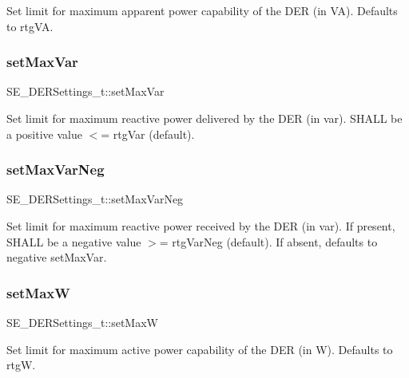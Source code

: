 Set limit for maximum apparent power capability of the D\+ER (in VA). Defaults to rtg\+VA. \mbox{\label{group__DERSettings_ga40736afafc4625a920cd726bb86c889f}} 
\subsubsection{\texorpdfstring{set\+Max\+Var}{setMaxVar}}
{\footnotesize\ttfamily S\+E\+\_\+\+D\+E\+R\+Settings\+\_\+t\+::set\+Max\+Var}

Set limit for maximum reactive power delivered by the D\+ER (in var). S\+H\+A\+LL be a positive value $<$= rtg\+Var (default). \mbox{\label{group__DERSettings_gab5d6fb6cb61c4d10e02d3717c40603a7}} 
\subsubsection{\texorpdfstring{set\+Max\+Var\+Neg}{setMaxVarNeg}}
{\footnotesize\ttfamily S\+E\+\_\+\+D\+E\+R\+Settings\+\_\+t\+::set\+Max\+Var\+Neg}

Set limit for maximum reactive power received by the D\+ER (in var). If present, S\+H\+A\+LL be a negative value $>$= rtg\+Var\+Neg (default). If absent, defaults to negative set\+Max\+Var. \mbox{\label{group__DERSettings_ga5c5d4f29bd3733e07577d46d4314705f}} 
\subsubsection{\texorpdfstring{set\+MaxW}{setMaxW}}
{\footnotesize\ttfamily S\+E\+\_\+\+D\+E\+R\+Settings\+\_\+t\+::set\+MaxW}

Set limit for maximum active power capability of the D\+ER (in W). Defaults to rtgW. \mbox{\label{group__DERSettings_ga73e4e2883d95a828b83ad77c478f38ae}} 
